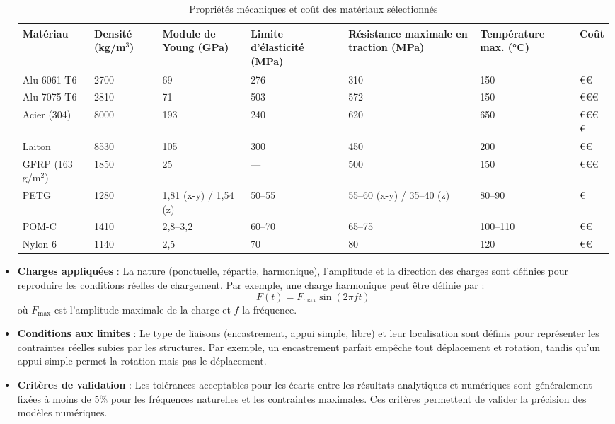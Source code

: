 \begin{itemize}
	\begin{table}[h!]
	\centering
	\begin{tabular}{|p{2cm}|p{1.2cm}|p{1.8cm}|p{1.8cm}|p{3cm}|p{2cm}|p{0.8cm}|}
		\hline
		Matériau & Densité (kg/m$^3$) & Module de Young (GPa) & Limite d'élasticité (MPa) & Résistance maximale en traction (MPa) & Température max. (°C) & Coût \\ \hline
		Alu 6061-T6 & 2700 & 69 & 276 & 310 & 150 & €€ \\ \hline
		Alu 7075-T6 & 2810 & 71 & 503 & 572 & 150 & €€€ \\ \hline
		Acier (304) & 8000 & 193 & 240 & 620 & 650 & €€€€ \\ \hline
		Laiton & 8530 & 105 & 300 & 450 & 200 & €€ \\ \hline
		GFRP (163 g/m$^2$) & 1850 & 25 & — & 500 & 150 & €€€ \\ \hline
		PETG & 1280 & 1,81 (x-y) / 1,54 (z) & 50--55 & 55--60 (x-y) / 35--40 (z) & 80--90 & € \\ \hline
		POM-C & 1410 & 2,8--3,2 & 60--70 & 65--75 & 100--110 & €€ \\ \hline
		Nylon 6 & 1140 & 2,5 & 70 & 80 & 120 & €€ \\ \hline
	\end{tabular}
	\caption{Propriétés mécaniques et coût des matériaux sélectionnés}
	\label{tab:choix_materiaux}
	\end{table}



\newpage
    \item \textbf{Charges appliquées} :
    La nature (ponctuelle, répartie, harmonique), l'amplitude et la direction des 
    charges sont définies pour reproduire les conditions réelles de chargement. Par 
    exemple, une charge harmonique peut être définie par :
    \[
    F(t) = F_{\text{max}} \sin(2 \pi f t)
    \]
    où \(F_{\text{max}}\) est l'amplitude maximale de la charge et \(f\) la fréquence.

    \item \textbf{Conditions aux limites} :
    Le type de liaisons (encastrement, appui simple, libre) et leur localisation sont 
    définis pour représenter les contraintes réelles subies par les structures. Par 
    exemple, un encastrement parfait empêche tout déplacement et rotation, tandis qu'un 
    appui simple permet la rotation mais pas le déplacement.

    \item \textbf{Critères de validation} :
    Les tolérances acceptables pour les écarts entre les résultats analytiques et 
    numériques sont généralement fixées à moins de 5\% pour les fréquences naturelles 
    et les contraintes maximales. Ces critères permettent de valider la précision des 
    modèles numériques.
\end{itemize}



